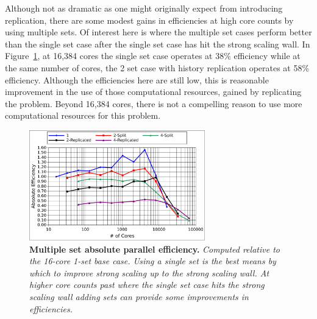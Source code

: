 \documentclass{snamc2013}
\begin{document}
Although not as dramatic as one might originally expect from
introducing replication, there are some modest gains in efficiencies
at high core counts by using multiple sets. Of interest here is where
the multiple set cases perform better than the single set case after
the single set case has hit the strong scaling wall. In
Figure~\ref{fig:titan_strong_ms_eff}, at 16,384 cores the single set
case operates at 38\% efficiency while at the same number of cores,
the 2 set case with history replication operates at 58\%
efficiency. Although the efficiencies here are still low, this is
reasonable improvement in the use of those computational resources,
gained by replicating the problem. Beyond 16,384 cores, there is not a
compelling reason to use more computational resources for this
problem.

\begin{figure}[h!]
  \begin{center}
    \includegraphics[width=3in]{titan_strong_ms_eff.pdf}
  \end{center}
  \caption{\textbf{Multiple set absolute parallel efficiency.}
    \textit{Computed relative to the 16-core 1-set base case. Using a
      single set is the best means by which to improve strong scaling
      up to the strong scaling wall. At higher core counts past where
      the single set case hits the strong scaling wall adding sets can
      provide some improvements in efficiencies.}}
  \label{fig:titan_strong_ms_eff}
\end{figure}
\end{document}
